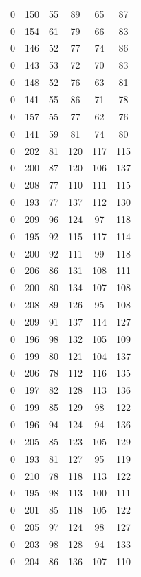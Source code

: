 \documentclass{article}
\begin{document}
\begin{spacing}{2}
\begin{center}
{\begin{longtable}{cccccc}
0   & 150 & 55  & 89  & 65  & 87 \\
0   & 154 & 61  & 79  & 66  & 83 \\
0   & 146 & 52  & 77  & 74  & 86 \\
0   & 143 & 53  & 72  & 70  & 83 \\
0   & 148 & 52  & 76  & 63  & 81 \\
0   & 141 & 55  & 86  & 71  & 78 \\
0   & 157 & 55  & 77  & 62  & 76 \\
0   & 141 & 59  & 81  & 74  & 80 \\
0   & 202 & 81  & 120 & 117 & 115 \\
0   & 200 & 87  & 120 & 106 & 137 \\
0   & 208 & 77  & 110 & 111 & 115 \\
0   & 193 & 77  & 137 & 112 & 130 \\
0   & 209 & 96  & 124 & 97  & 118 \\
0   & 195 & 92  & 115 & 117 & 114 \\
0   & 200 & 92  & 111 & 99  & 118 \\
0   & 206 & 86  & 131 & 108 & 111 \\
0   & 200 & 80  & 134 & 107 & 108 \\
0   & 208 & 89  & 126 & 95  & 108 \\
0   & 209 & 91  & 137 & 114 & 127 \\
0   & 196 & 98  & 132 & 105 & 109 \\
0   & 199 & 80  & 121 & 104 & 137 \\
0   & 206 & 78  & 112 & 116 & 135 \\
0   & 197 & 82  & 128 & 113 & 136 \\
0   & 199 & 85  & 129 & 98  & 122 \\
0   & 196 & 94  & 124 & 94  & 136 \\
0   & 205 & 85  & 123 & 105 & 129 \\
0   & 193 & 81  & 127 & 95  & 119 \\
0   & 210 & 78  & 118 & 113 & 122 \\
0   & 195 & 98  & 113 & 100 & 111 \\
0   & 201 & 85  & 118 & 105 & 122 \\
0   & 205 & 97  & 124 & 98  & 127 \\
0   & 203 & 98  & 128 & 94  & 133 \\
0   & 204 & 86  & 136 & 107 & 110 \\
    \end{longtable}}
    \end{center}


\end{spacing}
\end{document}
